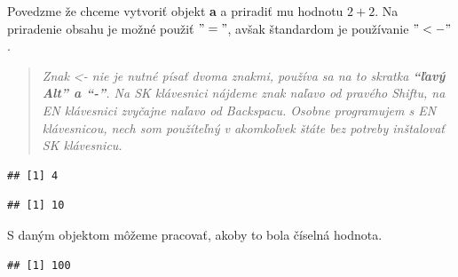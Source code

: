 Povedzme že chceme vytvoriť objekt \textbf{a} a priradiť mu hodnotu
\(2 + 2\). Na priradenie obsahu je možné použiť \("="\), avšak
štandardom je používanie \("<-"\).

\begin{quote}
\emph{Znak \textless- nie je nutné písať dvoma znakmi, používa sa na to
skratka \textbf{``ľavý Alt'' a ``-''}. Na SK klávesnici nájdeme znak
naľavo od pravého Shiftu, na EN klávesnici zvyčajne naľavo od Backspacu.
Osobne programujem s EN klávesnicou, nech som použíteľný v akomkoľvek
štáte bez potreby inštalovať SK klávesnicu.}
\end{quote}

\begin{Shaded}
\begin{Highlighting}[]
\StringTok{ } \OperatorTok{+}\StringTok{ }

\end{Highlighting}
\end{Shaded}

\begin{verbatim}
## [1] 4
\end{verbatim}

\begin{Shaded}
\begin{Highlighting}[]
\StringTok{ } \OperatorTok{+}\StringTok{ }

\end{Highlighting}
\end{Shaded}

\begin{verbatim}
## [1] 10
\end{verbatim}

S daným objektom môžeme pracovať, akoby to bola číselná hodnota.

\begin{Shaded}
\begin{Highlighting}[]
\OperatorTok{^}
\end{Highlighting}
\end{Shaded}

\begin{verbatim}
## [1] 100
\end{verbatim}

